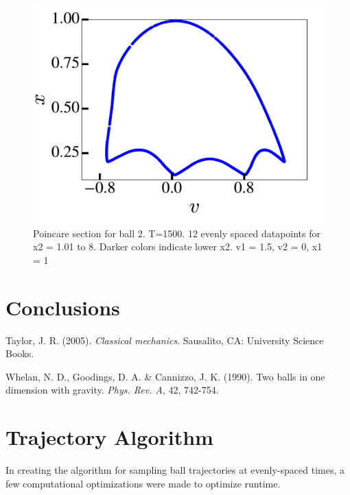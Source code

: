 \documentclass[pra,twocolumn,showpacs,amsmath,amssymb, aps, 10pt]{revtex4-1}
\begin{document}
\begin{figure}
  \includegraphics[width=0.8\linewidth]{nonchaotic_r0_1_poincare}
  \caption{Poincare section for ball 2. T=1500. 12 evenly spaced datapoints for
  x2 = 1.01 to 8. Darker colors indicate lower x2. v1 = 1.5, v2 = 0, x1 = 1} %
  \label{fig:0.9-traj-nonchaotic}
\end{figure}





\section{Conclusions} \label{sec:conclusion}




\begin{thebibliography}{1}
  Taylor, J. R. (2005).
  \textit{Classical mechanics}.
  Sausalito, CA: University Science Books.

Whelan, N. D., Goodings, D. A. \& Cannizzo, J. K. (1990).
Two balls in one dimension with gravity.
\textit{Phys. Rev. A}, 42, 742-754.
\end{thebibliography}

\clearpage
\appendix
\section{Trajectory Algorithm}\label{appendix:traj}
In creating the algorithm for sampling ball trajectories at evenly-spaced times,
a few computational optimizations were made to optimize runtime.
\end{document}
